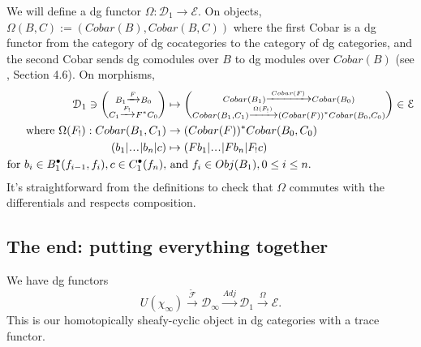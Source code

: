 We will define a dg functor $\Omega: 
\mathcal{D}_1 \to \mathcal{E}$. 
On objects, $\Omega(B,C) := 
(Cobar(B), Cobar(B,C))$ where the first 
Cobar is a dg functor from the category of 
dg cocategories to the category of dg 
categories, and the second Cobar sends 
dg comodules over $B$ to dg modules over 
$Cobar(B)$ (see \cite{T}, Section 4.6). 
On morphisms, 
\begin{align*}
\mathcal{D}_1 \ni
\bigg(\substack{
	B_1 \xrightarrow{F} B_0\\
	C_1 \xrightarrow{F_!} F^*C_0}\bigg)
& \mapsto
\bigg(\substack{
  Cobar(B_1)\xrightarrow{Cobar(F)}Cobar(B_0)\\
  Cobar(B_1,C_1) \xrightarrow{\Omega(F_!)} 
  (Cobar(F))^*Cobar(B_0,C_0)}\bigg)
\in \mathcal{E}  \\
\textrm{where } 
\Omega(F_!): Cobar(B_1,C_1)
& \to
(Cobar(F))^*Cobar(B_0,C_0)\\
(b_1|\smdots|b_n|c)
&\mapsto
(Fb_1|\smdots|Fb_n|F_!c)\\
\textrm{for } 
  b_i \in B_1^\bullet(f_{i-1},f_i),
  c \in C_1^\bullet(f_n), 
&\textrm{ and } f_i \in 
  Obj(B_1), 0 \leq i \leq n.
\end{align*}
It's straightforward from the definitions 
to check that $\Omega$ commutes with 
the differentials and respects composition.

\subsection{The end: putting everything together}
We have dg functors
$$
U(\chi_\infty) \xrightarrow{\tilde{\mathcal{F}}}
\mathcal{D}_\infty \xrightarrow{Adj}
\mathcal{D}_1 \xrightarrow{\Omega}
\mathcal{E}.
$$
This is our homotopically sheafy-cyclic object 
in dg categories with a trace functor.
